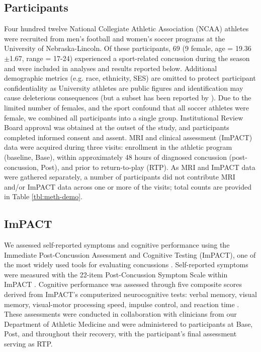 \documentclass[]{imag-ms-template}
\begin{document}
\subsection{Participants}
\label{ssec:meth-part}
Four hundred twelve National Collegiate Athletic Association (NCAA) athletes were recruited from men's football and women's soccer programs at the University of Nebraska-Lincoln. Of these participants, 69 (9 female, age = 19.36 $\pm$1.67, range = 17-24) experienced a sport-related concussion during the season and were included in analyses and results reported below. Additional demographic metrics (e.g. race, ethnicity, SES) are omitted to protect participant confidentiality as University athletes are public figures and identification may cause deleterious consequences (but a subset has been reported by \cite{bouchard2024ConcussionRelatedDisruptionsHub}). Due to the limited number of females, and the sport confound that all soccer athletes were female, we combined all participants into a single group. Institutional Review Board approval was obtained at the outset of the study, and participants completed informed consent and assent. MRI and clinical assessment (ImPACT) data were acquired during three visits: enrollment in the athletic program (baseline, Base), within approximately 48 hours of diagnosed concussion (post-concussion, Post), and prior to return-to-play (RTP). As MRI and ImPACT data were gathered separately, a number of participants did not contribute MRI and/or ImPACT data across one or more of the visits; total counts are provided in Table \ref{tbl:meth-demo}.

\begin{table}[H]
	\centering
	\scriptsize
	
	\caption{Number of athletes that contributed MRI and ImPACT data across all visits. Base = baseline, Post = post-concussion, RTP = return-to-play. M = Male, F = Female.}
	\label{tbl:meth-demo}
\end{table}


\subsection{ImPACT}
\label{ssec:meth-imp}
We assessed self-reported symptoms and cognitive performance using the Immediate Post-Concussion Assessment and Cognitive Testing (ImPACT), one of the most widely used tools for evaluating concussions \parencite{lovell2005ImPACT200540,dessy2017ReviewAssessmentScales}. Self-reported symptoms were measured with the 22-item Post-Concussion Symptom Scale within ImPACT \parencite{lovell2006MeasurementSymptomsFollowing}. Cognitive performance was assessed through five composite scores derived from ImPACT's computerized neurocognitive tests: verbal memory, visual memory, visual-motor processing speed, impulse control, and reaction time \parencite{lovell2005ImPACT200540}. These assessments were conducted in collaboration with clinicians from our Department of Athletic Medicine and were administered to participants at Base, Post, and throughout their recovery, with the participant's final assessment serving as RTP.
\end{document}

